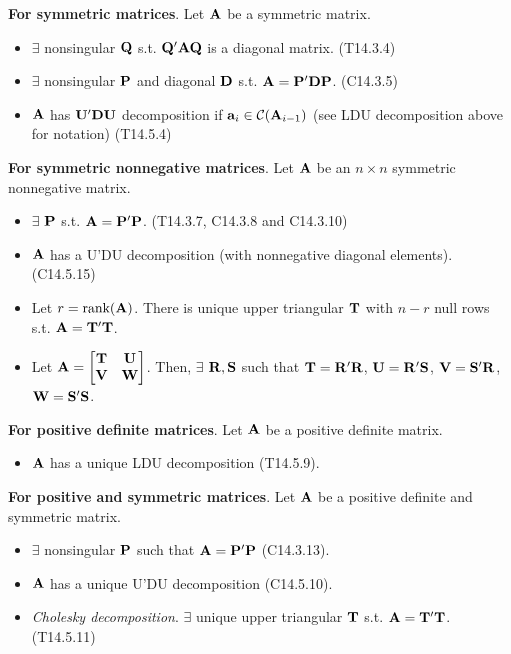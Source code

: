 \documentclass[a4paper, oneside]{book}
\begin{document}
\noindent\textbf{For symmetric matrices}. Let $\mathbf{A}$ be a symmetric matrix. 
\begin{itemize}
\item $\exists$ nonsingular $\mathbf{Q}$ s.t. $\mathbf{Q'AQ}$ is a diagonal matrix. (T14.3.4)
\item $\exists$ nonsingular $\mathbf{P}$ and diagonal $\mathbf{D}$  s.t. $\mathbf{A}=\mathbf{P'DP}$. (C14.3.5)
\item $\mathbf{A}$ has $\mathbf{U'DU}$ decomposition if $\mathbf{a}_i \in \mathcal{C}(\mathbf{A}_{i-1})$ (see LDU decomposition above for notation) (T14.5.4) 
\end{itemize}

\noindent\textbf{For symmetric nonnegative matrices}. Let $\mathbf{A}$ be an $n\times n$ symmetric nonnegative matrix.
\begin{itemize}
\item $\exists$  $\mathbf{P}$ s.t. $\mathbf{A}=\mathbf{P'P}$. (T14.3.7, C14.3.8 and C14.3.10)
\item $\mathbf A$ has a U'DU decomposition (with nonnegative diagonal elements). (C14.5.15)
\item Let $r=\text{rank}(\mathbf{A})$. There is unique upper triangular $\mathbf{T}$ with $n-r$ null rows s.t. $\mathbf{A=T'T}$.
\item Let $\mathbf{A}=\begin{bmatrix}
\mathbf{T} & \mathbf U \\ \mathbf V & \mathbf W
\end{bmatrix}$. Then, $\exists$ $\mathbf{R,S}$ such that $\mathbf{T}=\mathbf{R'R}$, $\mathbf{U=R'S}$, $\mathbf{V=S'R}$, $\mathbf{W=S'S}$. 
\end{itemize}


\noindent\textbf{For positive definite matrices}. Let $\mathbf{A}$ be a positive definite matrix.\begin{itemize}
\item $\mathbf{A}$ has a unique LDU decomposition (T14.5.9).
\end{itemize}

\noindent\textbf{For positive and symmetric matrices}. Let $\mathbf{A}$ be a positive definite and symmetric matrix.\begin{itemize}
\item $\exists$ nonsingular $\mathbf{P}$ such that $\mathbf{A=P'P}$ (C14.3.13).
\item $\mathbf{A}$ has a unique U'DU decomposition (C14.5.10).
\item \textit{Cholesky decomposition}. $\exists$ unique upper triangular $\mathbf{T}$ s.t. $\mathbf{A}=\mathbf{T'T}$. (T14.5.11)
\end{itemize}
\end{document}
